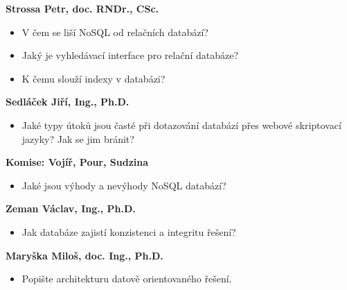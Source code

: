 \documentclass[12pt,a4paper]{article}
\begin{document}
\begin{profesorbox}
\textbf{Strossa Petr, doc. RNDr., CSc.}
\begin{itemize}
  \item V čem se liší NoSQL od relačních databází?
  \item Jaký je vyhledávací interface pro relační databáze?
  \item K čemu slouží indexy v databázi?
\end{itemize}

\textbf{Sedláček Jiří, Ing., Ph.D.}
\begin{itemize}
  \item Jaké typy útoků jsou časté při dotazování databází přes webové skriptovací jazyky?
    Jak se jim bránit?
\end{itemize}

\textbf{Komise: Vojíř, Pour, Sudzina}
\begin{itemize}
  \item Jaké jsou výhody a nevýhody NoSQL databází?
\end{itemize}

\textbf{Zeman Václav, Ing., Ph.D.}
\begin{itemize}
  \item Jak databáze zajistí konzistenci a integritu řešení?
\end{itemize}

\textbf{Maryška Miloš, doc. Ing., Ph.D.}
\begin{itemize}
  \item Popište architekturu datově orientovaného řešení.
\end{itemize}
\end{profesorbox}
\end{document}
